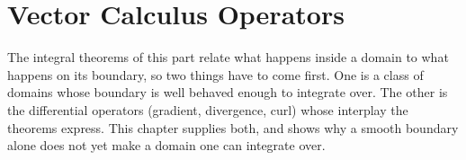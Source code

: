 \chapter{Vector Calculus Operators}
\label{ch:vector_calculus}

The integral theorems of this part relate what happens inside a domain to what happens on its
boundary, so two things have to come first. One is a class of domains whose boundary is well
behaved enough to integrate over. The other is the differential operators (gradient, divergence,
curl) whose interplay the theorems express. This chapter supplies both, and shows why a smooth
boundary alone does not yet make a domain one can integrate over.




